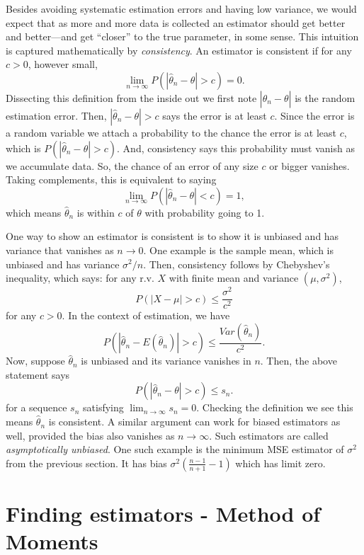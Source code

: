 \documentclass[
]{book}
\begin{document}
Besides avoiding systematic estimation errors and having low variance, we would expect that as more and more data is collected an estimator should get better and better---and get ``closer'' to the true parameter, in some sense. This intuition is captured mathematically by \emph{consistency}. An estimator is consistent if for any \(c>0\), however small,
\[\lim_{n\rightarrow \infty} P(|\hat\theta_n-\theta|>c) = 0.\]
Dissecting this definition from the inside out we first note \(|\hat\theta_n - \theta|\) is the random estimation error. Then, \(|\hat\theta_n-\theta|>c\) says the error is at least \(c\). Since the error is a random variable we attach a probability to the chance the error is at least \(c\), which is \(P(|\hat\theta_n-\theta|>c)\). And, consistency says this probability must vanish as we accumulate data. So, the chance of an error of any size \(c\) or bigger vanishes. Taking complements, this is equivalent to saying
\[\lim_{n\rightarrow \infty} P(|\hat\theta_n-\theta|<c) = 1,\]
which means \(\hat\theta_n\) is within \(c\) of \(\theta\) with probability going to 1.

One way to show an estimator is consistent is to show it is unbiased and has variance that vanishes as \(n\rightarrow 0\). One example is the sample mean, which is unbiased and has variance \(\sigma^2/n\). Then, consistency follows by Chebyshev's inequality, which says: for any r.v. \(X\) with finite mean and variance \((\mu, \sigma^2)\),
\[P(|X - \mu|>c)\leq \frac{\sigma^2}{c^2}\]
for any \(c>0\). In the context of estimation, we have
\[P(|\hat\theta_n - E(\hat\theta_n)|>c) \leq \frac{Var(\hat\theta_n)}{c^2}.\]
Now, suppose \(\hat\theta_n\) is unbiased and its variance vanishes in \(n\). Then, the above statement says
\[P(|\hat\theta_n - \theta|>c) \leq s_n.\]
for a sequence \(s_n\) satisfying \(\lim_{n\rightarrow \infty} s_n = 0\). Checking the definition we see this means \(\hat\theta_n\) is consistent. A similar argument can work for biased estimators as well, provided the bias also vanishes as \(n\rightarrow\infty\). Such estimators are called \emph{asymptotically unbiased}. One such example is the minimum MSE estimator of \(\sigma^2\) from the previous section. It has bias \(\sigma^2(\frac{n-1}{n+1}-1)\) which has limit zero.

\hypertarget{finding-estimators---method-of-moments}{%
\section{Finding estimators - Method of Moments}\label{finding-estimators---method-of-moments}}
\end{document}
